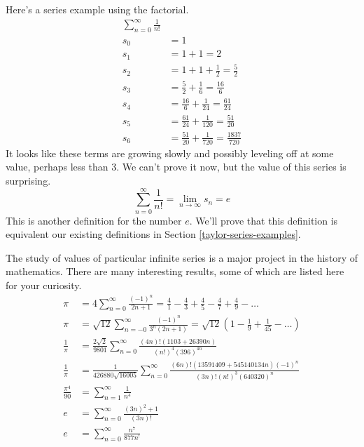 \documentclass[fleqn,letterpaper]{report}
\begin{document}
\begin{example}
Here's a series example using the factorial.
\begin{align*}
\sum_{n=0}^\infty \frac{1}{n!} & \\
s_0 & = 1 \\
s_1 & = 1 + 1 = 2 \\
s_2 & = 1 + 1 + \frac{1}{2} = \frac{5}{2} \\
s_3 & = \frac{5}{2} + \frac{1}{6} = \frac{16}{6} \\
s_4 & = \frac{16}{6} + \frac{1}{24} = \frac{61}{24} \\
s_5 & = \frac{61}{24} + \frac{1}{120} = \frac{51}{20} \\
s_6 & = \frac{51}{20} + \frac{1}{720} = \frac{1837}{720} 
\end{align*}
It looks like these terms are growing slowly and possibly
leveling off at some value, perhaps less than 3. We can't
prove it now, but the value of this series is surprising.
\begin{equation*}
\sum_{n=0}^{\infty} \frac{1}{n!} = \lim_{n \rightarrow \infty}
s_n = e
\end{equation*}
This is another definition for the number $e$. We'll prove
that this definition is equivalent our existing definitions
in Section \ref{taylor-series-examples}.
\end{example}

\begin{example}
The study of values of particular infinite series is a major
project in the history of mathematics. There are many
interesting results, some of which are listed here for your
curiosity.
\begin{align*}
\pi & = 4 \sum_{n=0}^\infty \frac{(-1)^n}{2n+1} = 
\frac{4}{1} - \frac{4}{3} + \frac{4}{5} - \frac{4}{7} + 
\frac{4}{9} - \ldots \\
\pi & = \sqrt{12} \sum_{n=-0}^\infty \frac{(-1)^n}{3^n (2n+1)}
= \sqrt{12} \left( 1 - \frac{1}{9} + \frac{1}{45} - \ldots
\right) \\
\frac{1}{\pi} & = \frac{2\sqrt{2}}{9801} \sum_{n=0}^\infty
\frac{ (4n)! (1103 + 26390n)}{(n!)^4 (396)^{4n}} \\
\frac{1}{\pi} & = \frac{1}{426880 \sqrt{16005}}
\sum_{n=0}^\infty \frac{(6n)! (13591409 + 545140134n)
(-1)^n}{(3n)! (n!)^3 (640320)^n} \\
\frac{\pi^4}{90} & = \sum_{n=1}^\infty \frac{1}{n^4} \\
e & = \sum_{n=0}^\infty \frac{(3n)^2+1}{(3n)!} \\
e & = \sum_{n=0}^\infty \frac{n^7}{877n^!} 
\end{align*}
\end{example}
\end{document}
